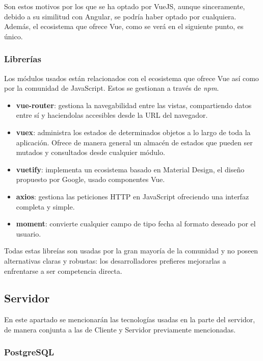 Son estos motivos por los que se ha optado por VueJS, aunque sinceramente, debido a su similitud con Angular, se podría haber optado por cualquiera. Además, el ecosistema que ofrece Vue, como se verá en el siguiente punto, es único.

\subsubsection{Librerías}

Los módulos usados están relacionados con el ecosistema que ofrece Vue así como por la comunidad de JavaScript. Estos se gestionan a través de \textit{npm}.

\begin{itemize}
    \item \textbf{vue-router}: gestiona la navegabilidad entre las vistas, compartiendo datos entre sí y haciendolas accesibles desde la URL del navegador.
    \item \textbf{vuex}: administra los estados de determinados objetos a lo largo de toda la aplicación. Ofrece de manera general un almacén de estados que pueden ser mutados y consultados desde cualquier módulo.
    \item \textbf{vuetify}: implementa un ecosistema basado en Material Design, el diseño propuesto por Google, usado componentes Vue.
    \item \textbf{axios}: gestiona las peticiones HTTP en JavaScript ofreciendo una interfaz completa y simple.
    \item \textbf{moment}: convierte cualquier campo de tipo fecha al formato deseado por el usuario.
\end{itemize}

Todas estas libreías son usadas por la gran mayoría de la comunidad y no poseen alternativas claras y robustas: los desarrolladores prefieres mejorarlas a enfrentarse a ser competencia directa.

\subsection{Servidor}

En este apartado se mencionarán las tecnologías usadas en la parte del servidor, de manera conjunta a las de Cliente y Servidor previamente mencionadas.

\subsubsection{PostgreSQL}

